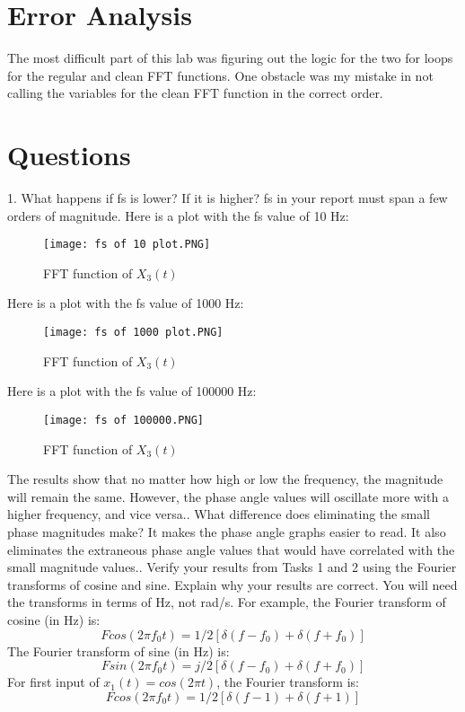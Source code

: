 \documentclass[12pt]{article}
\begin{document}
\section{Error Analysis}
The most difficult part of this lab was figuring out the logic for the two for loops for the regular and clean FFT functions. One obstacle was my mistake in not calling the variables for the clean FFT function in the correct order.

\section{Questions}
1. What happens if fs is lower? If it is higher? fs in your report must span a few orders of
magnitude.\newline
Here is a plot with the fs value of 10 Hz:
 \begin{figure}[H]
\texttt{[image: fs of 10 plot.PNG]} 
  \caption{FFT function of $X_3(t)$}
  \end{figure}
Here is a plot with  the fs value of 1000 Hz:
\begin{figure}[H]
\texttt{[image: fs of 1000 plot.PNG]} 
  \caption{FFT function of $X_3(t)$}
  \end{figure} 
Here is a plot with the fs value of 100000 Hz:
\begin{figure}[H]
\texttt{[image: fs of 100000.PNG]} 
  \caption{FFT function of $X_3(t)$}
  \end{figure}
The results show that no matter how high or low the frequency, the magnitude will remain the same. However, the phase angle values will oscillate more with a higher frequency, and vice versa.. What difference does eliminating the small phase magnitudes make?\newline
It makes the phase angle graphs easier to read. It also eliminates the extraneous phase angle values that would have correlated with the small magnitude values.. Verify your results from Tasks 1 and 2 using the Fourier transforms of cosine and sine. Explain why your results are correct. You will need the transforms in terms of Hz, not rad/s.
For example, the Fourier transform of cosine (in Hz) is:
\[F {cos (2\pi f_0t)} =1/2[\delta (f − f_0) + \delta (f + f_0)]\]
The Fourier transform of sine (in Hz) is:
\[F {sin (2\pi f_0t)} =j/2[\delta (f − f_0) + \delta (f + f_0)]\]
For first input of $x_1(t) = cos(2\pi t)$, the Fourier transform is:
\[F {cos (2\pi f_0t)} =1/2[\delta (f − 1) + \delta (f + 1)]\]
\end{document}

